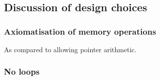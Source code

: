 \subsection{Discussion of design choices}
\label{subsec:discussion_of_design_choices}

\subsubsection*{Axiomatisation of memory operations}

As compared to allowing pointer arithmetic.

\subsubsection*{No loops}


